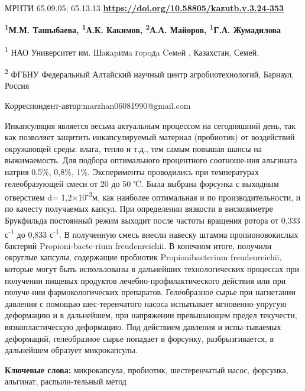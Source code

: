 \newpage
МРНТИ 65.09.05; 65.13.13
\hfill {\bfseries \href{https://doi.org/10.58805/kazutb.v.3.24-353}{https://doi.org/10.58805/kazutb.v.3.24-353}}


\begin{center}

{\bfseries \textsuperscript{1}М.М. Ташыбаева\envelope,
\textsuperscript{1}А.К. Какимов, \textsuperscript{2}А.А. Майоров,
\textsuperscript{1}Г.А. Жумадилова}

\textsuperscript{1} НАО Университет им. Шaкapимa гopoдa Ceмeй ,
Казахстан, Семей,

\textsuperscript{2} ФГБНУ Федеральный Алтайский научный центр
агробиотехнологий, Барнаул, Россия
\end{center}
\envelope Корреспондент-автор:marzhan06081990@gmail.com \vspace{0.5cm}


Инкапсуляция является весьма актуальным процессом на сегодняшний день,
так как позволяет защитить инкапсулируемый материал (пробиотик) от
воздействий окружающей среды: влага, тепло и т.д., тем самым повышая
шансы на выжимаемость. Для подбора оптимального процентного соотноше-ния
альгината натрия 0,5\%, 0,8\%, 1\%. Эксперименты проводились при
температурах гелеобразующей смеси от 20 до 50 ℃. Была выбрана форсунка с
выходным отверстием d= 1,2×10\textsuperscript{-3}м, как наиболее
оптимальная и по производительности, и по качесту получаемых капсул. При
определении вязкости в вискозиметре Брукфильда постоянный режим выходит
после частоты вращения ротора от 0,333 с\textsuperscript{-1} до 0,833
с\textsuperscript{-1}. В полученную смесь внесли навеску штамма
пропионовокислых бактерий Propioni-bacte-rium freudenreichii. В конечном
итоге, получили округлые капсулы, содержащие пробиотик Propionibacterium
freudenreichii, которые могут быть использованы в дальнейших
технологических процессах при получении пищевых продуктов
лечебно-профилактического действия или при получе-нии фармокологических
препаратов. Гелеобразное сырье при нагнетании давления с помощью
шес-теренчатого насоса испытывает мгновенно-упругую деформацию и в
дальнейшем, при напряжении превышающем предел текучести,
вязкопластическую деформацию. Под действием давления и испы-тываемых
деформаций, гелеобразное сырье попадает в форсунку, разбрызгивается, в
дальнейшем образует микрокапсулы.

{\bfseries Ключевые слова:} микрокапсула, пробиотик, шестеренчатый насос,
форсунка, альгинат, распыли-тельный метод


